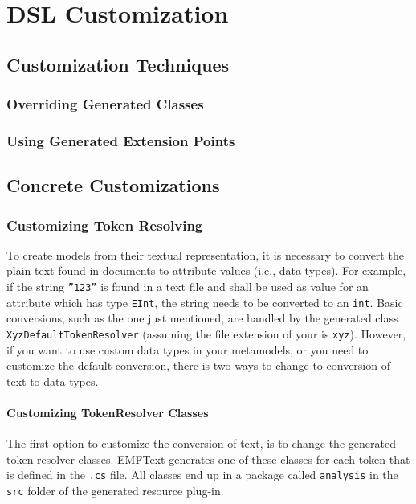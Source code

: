 \chapter{DSL Customization}

\section{Customization Techniques}

\subsection{Overriding Generated Classes}

\subsection{Using Generated Extension Points}



\section{Concrete Customizations}

\subsection{Customizing Token Resolving}
\label{sec:cust_token_resolving}

To create models from their textual representation, it is necessary to convert
the plain text found in \DSL documents to attribute values (i.e., data types).
For example, if the string \texttt{''123''} is found in a text file and shall be used as value for an
attribute which has type \texttt{EInt}, the string needs to be converted to an
\texttt{int}. Basic conversions, such as the one just mentioned, are handled by
the generated class \texttt{XyzDefaultTokenResolver} (assuming the file
extension of your \DSL is \texttt{xyz}). However, if you want to use custom data
types in your metamodels, or you need to customize the default conversion, there
is two ways to change to conversion of text to data types.

\subsubsection{Customizing TokenResolver Classes}

The first option to customize the conversion of text, is to change the generated
token resolver classes. EMFText generates one of these classes for each token
that is defined in the \texttt{.cs} file. All classes end up in a package called
\texttt{analysis} in the \texttt{src} folder of the generated resource plug-in.

